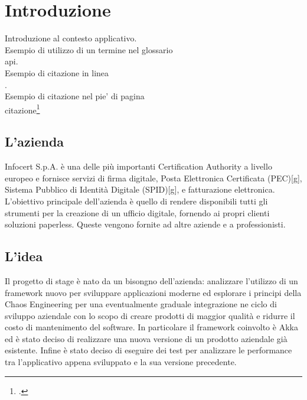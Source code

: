 
\chapter{Introduzione}
\label{cap:introduzione}

Introduzione al contesto applicativo.\\

\noindent Esempio di utilizzo di un termine nel glossario \\
\gls{api}. \\

\noindent Esempio di citazione in linea \\
\cite{site:agile-manifesto}. \\

\noindent Esempio di citazione nel pie' di pagina \\
citazione\footcite{womak:lean-thinking} \\

\section{L'azienda}

Infocert S.p.A. è una delle più importanti Certification Authority a livello europeo
e fornisce servizi di firma digitale, Posta Elettronica Certificata (PEC)[g], Sistema
Pubblico di Identità Digitale (SPID)[g], e fatturazione elettronica. L’obiettivo principale
dell’azienda è quello di rendere disponibili tutti gli strumenti per la creazione di un
ufficio digitale, fornendo ai propri clienti soluzioni paperless. Queste vengono fornite
ad altre aziende e a professionisti.

\section{L'idea}
Il progetto di stage è nato da un bisongno dell'azienda: analizzare l'utilizzo di un framework nuovo per sviluppare applicazioni moderne ed esplorare i principi della Chaos Engineering per una eventualmente graduale integrazione ne ciclo di sviluppo aziendale con lo scopo di creare prodotti di maggior qualità e ridurre il costo di mantenimento del software.
In particolare il framework coinvolto è Akka ed è stato deciso di realizzare una nuova versione di un prodotto aziendale già esistente.
Infine è stato deciso di eseguire dei test per analizzare le performance tra l'applicativo appena sviluppato e la sua versione precedente.


